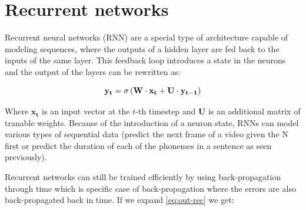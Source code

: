 

\section{Recurrent networks}

Recurrent neural networks (RNN) are a special type of architecture capable of modeling sequences, where the outputs of a hidden layer are fed back to the inputs of the same layer. This feedback loop introduces a state in the neurons and the output of the layers can be rewritten as:

\begin{equation}
    \centering
    \mathbf{y_t} = \sigma \left ( \mathbf{W} \cdot \mathbf{x_t} + \mathbf{U} \cdot \mathbf{y_{t-1}} \right )
    \label{eq:out-rec}
\end{equation}

Where $\mathbf{x_t}$ is an input vector at the $t$-th timestep and $\mathbf{U}$ is an additional matrix of tranable weights. Because of the introduction of a neuron state, RNNs can model various types of sequential data (predict the next frame of a video given the N first or predict the duration of each of the phonemes in a sentence as seen previously).

Recurrent networks can still be trained efficiently by using back-propagation through time \cite{werbos1990backpropagation} which is specific case of back-propagation where the errors are also back-propagated back in time. If we expand \eqref{eq:out-rec} we get:


